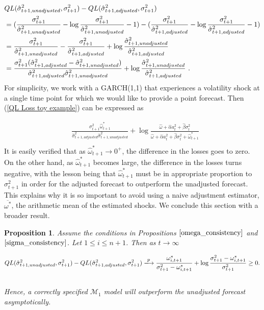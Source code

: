 \documentclass[11pt,3p,review,authoryear]{elsarticle}
\def\mc#1{\mathcal{#1}} %
\def\mc#1{\mathcal{#1}}
\newtheorem{prop}{Proposition}
\theoremstyle{definition}
\begin{document}
\begin{align}
  & QL(\hat\sigma_{t+1, unadjusted}^{2},\sigma^{2}_{t+1})-QL(\hat\sigma^{2}_{t+1, adjusted},\sigma^{2}_{t+1})\notag \\
   & =(\frac{\sigma_{t+1}^{2}}{\hat\sigma^{2}_{t+1,unadjusted}} - \log{\frac{\sigma_{t+1}^{2}}{\hat\sigma^{2}_{t+1,unadjusted}} } - 1) - (\frac{\sigma_{t+1}^{2}}{\hat\sigma^{2}_{t+1,adjusted}} - \log{\frac{\sigma_{t+1}^{2}}{\hat\sigma^{2}_{t+1,adjusted}}} - 1)\notag\\
   & = \frac{\sigma_{t+1}^{2}}{\hat\sigma^{2}_{t+1,unadjusted}} - \frac{\sigma_{t+1}^{2}}{\hat\sigma^{2}_{t+1,adjusted}}+ \log{\frac{\hat\sigma^{2}_{t+1,unadjusted}}{\hat\sigma^{2}_{t+1,adjusted}}}\notag\\
   & = \frac{\sigma_{t+1}^{2}(\hat\sigma^{2}_{t+1,adjusted}-\hat\sigma^{2}_{t+1,unadjusted})}{\hat\sigma^{2}_{t+1,adjusted}\hat\sigma^{2}_{t+1,unadjusted}} + \log{\frac{\hat\sigma^{2}_{t+1,unadjusted}}{\hat\sigma^{2}_{t+1,adjusted}}}\label{QL Loss toy example} \text{ .}
\end{align}
For simplicity, we work with a GARCH(1,1) that experiences a volatility shock at a single time point for which we would like to provide a point forecast.  Then (\ref{QL Loss toy example}) can be expressed as

\begin{align*}
   &\frac{\sigma^{2}_{t+1}\hat\omega^{*}_{t+1} }{\hat\sigma^{2}_{t+1,adjusted}\hat\sigma^{2}_{t+1,unadjusted}} + \log{\frac{\hat\omega + \hat\alpha a_{t}^{2} + \hat\beta\sigma_{t}^{2}}{\hat\omega + \hat\alpha a_{t}^{2} + \hat\beta\sigma_{t}^{2} + \hat\omega^{*}_{t+1}}}\\
\end{align*}\label{QL Loss Consistency - GARCH(1,1)}
It is easily verified that as $\hat\omega^{*}_{t+1} \rightarrow 0^{+}$, the difference in the losses goes to zero.  On the other hand, as $\hat\omega^{*}_{t+1}$ becomes large, the difference in the losses turns negative, with the lesson being that $\hat\omega^{*}_{t+1}$ must be in appropriate proportion to $\sigma^{2}_{t+1}$ in order for the adjusted forecast to outperform the unadjusted forecast.  This explains why it is so important to avoid using a naive adjustment estimator, $\overline{\omega^{*}}$, the arithmetic mean of the estimated shocks.  We conclude this section with a broader result. 

\begin{prop}\label{asymptotic_consistency}
Assume the conditions in Propositions $\ref{omega_consistency}$ and $\ref{sigma_consistency}$.  Let $1\leq i\leq n+1$.  Then as $t\rightarrow \infty$
  
$$QL(\hat\sigma_{t+1, unadjusted}^{2},\sigma^{2}_{t+1})-QL(\hat\sigma^{2}_{t+1, adjusted},\sigma^{2}_{t+1})\xlongrightarrow{p} \frac{\omega_{i,t+1}^{*}}{\sigma^{2}_{t+1}-\omega_{i,t+1}^{*}} + \log{\frac{\sigma_{t+1}^{2}-\omega_{i,t+1}^{*}}{\sigma_{t+1}^{2}} } \geq 0.$$\\

Hence, a correctly specified $\mc{M}_1$ model will outperform the unadjusted forecast asymptotically.
\end{prop}
\end{document}
